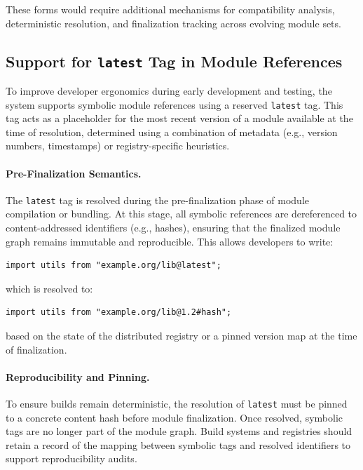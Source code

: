 \documentclass[sigplan,screen]{acmart}
\begin{document}
These forms would require additional mechanisms for compatibility analysis, deterministic resolution, and finalization tracking across evolving module sets.
\subsection{Support for \texttt{latest} Tag in Module References}

To improve developer ergonomics during early development and testing, the system supports symbolic module references using a reserved \texttt{latest} tag. This tag acts as a placeholder for the most recent version of a module available at the time of resolution, determined using a combination of metadata (e.g., version numbers, timestamps) or registry-specific heuristics.

\paragraph{Pre-Finalization Semantics.}
The \texttt{latest} tag is resolved during the pre-finalization phase of module compilation or bundling. At this stage, all symbolic references are dereferenced to content-addressed identifiers (e.g., hashes), ensuring that the finalized module graph remains immutable and reproducible. This allows developers to write:

\begin{verbatim}
import utils from "example.org/lib@latest";
\end{verbatim}

\noindent which is resolved to:

\begin{verbatim}
import utils from "example.org/lib@1.2#hash";
\end{verbatim}

\noindent based on the state of the distributed registry or a pinned version map at the time of finalization.

\paragraph{Reproducibility and Pinning.}
To ensure builds remain deterministic, the resolution of \texttt{latest} must be pinned to a concrete content hash before module finalization. Once resolved, symbolic tags are no longer part of the module graph. Build systems and registries should retain a record of the mapping between symbolic tags and resolved identifiers to support reproducibility audits.
\end{document}
